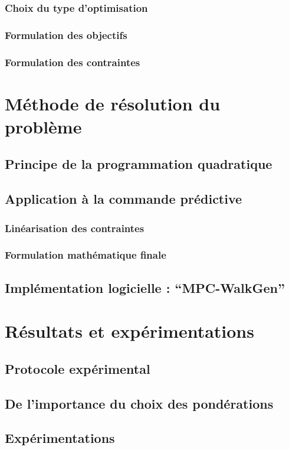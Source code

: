 \documentclass[12pt]{report}
\begin{document}
			\subsubsection{Choix du type d'optimisation}
			\subsubsection{Formulation des objectifs}
			\subsubsection{Formulation des contraintes}
	\section{Méthode de résolution du problème}
		\subsection{Principe de la programmation quadratique}
		\subsection{Application à la commande prédictive}
			\subsubsection{Linéarisation des contraintes}
			\subsubsection{Formulation mathématique finale}
		\subsection{Implémentation logicielle : ``MPC-WalkGen''}
	\section{Résultats et expérimentations}
		\subsection{Protocole expérimental}
		\subsection{De l'importance du choix des pondérations}
		\subsection{Expérimentations}
\end{document}
